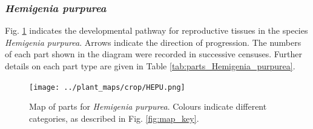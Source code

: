 \documentclass[10pt,twoside]{article}\usepackage[]{graphicx}\usepackage[]{color}
\begin{document}
\clearpage


\subsubsection{\emph{Hemigenia purpurea}}

Fig. \ref{fig:map_Hemigenia_purpurea} indicates the developmental pathway for reproductive tissues in the species \emph{Hemigenia purpurea}. Arrows indicate the direction of progression.  The numbers of each part shown in the diagram were recorded in successive censuses. Further details on each part type are given in Table \ref{tab:parts_Hemigenia_purpurea}.


\begin{figure}[h]
\centering
\texttt{[image: ../plant\_maps/crop/HEPU.png]}
\caption{Map of parts for \emph{Hemigenia purpurea}. Colours indicate different categories, as described in Fig. \ref{fig:map_key}.}
\label{fig:map_Hemigenia_purpurea}
\end{figure}
\end{document}
